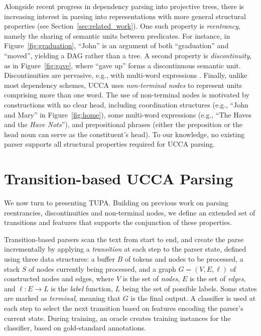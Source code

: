 \documentclass[11pt,a4paper]{article}
\newcommand{\parser}[1]{TUPA\textsubscript{#1}}
\newcommand{\secref}[1]{Section~\ref{#1}}
\newcommand{\figref}[1]{Figure~\ref{#1}}
\begin{document}
Alongside recent progress in dependency parsing into projective trees,
there is increasing interest in parsing into 
representations with more general structural properties  (see \secref{sec:related_work}).
One such property is \textit{reentrancy},
namely the sharing of semantic units between predicates.
For instance, in \figref{fig:graduation},
``John'' is an argument of both ``graduation''
and ``moved'', yielding a DAG rather than a tree.
A second property is \textit{discontinuity},
as in \figref{fig:gave}, where ``gave up'' forms a discontinuous semantic unit.
Discontinuities are pervasive, e.g.,  with multi-word
expressions \cite{schneider2014discriminative}.
Finally, unlike most dependency schemes, UCCA uses \textit{non-terminal nodes}
to represent units comprising more than one word.
The use of non-terminal nodes is motivated by constructions with no clear head, including
coordination structures (e.g., ``John and Mary'' in \figref{fig:home}),
some multi-word expressions (e.g., ``The Haves and the \textit{Have Nots}''),
and prepositional phrases (either the preposition or the head noun can serve as the constituent's head).
To our knowledge, no existing parser supports all structural properties required for UCCA
parsing.



\section{Transition-based UCCA Parsing}\label{sec:parser}

We now turn to presenting \parser{}.
Building on previous work on parsing reentrancies, discontinuities and non-terminal nodes,
we define an extended set of transitions and features that supports the conjunction of
these properties.

Transition-based parsers \cite{Nivre03anefficient} scan the text from start to end,
and create the parse incrementally by applying a \textit{transition}
at each step to the parser state,
defined using three data structures: a buffer $B$ of tokens and nodes to be processed,
a stack $S$ of nodes currently being processed,
and a graph $G=(V,E,\ell)$ of constructed nodes and edges,
where $V$ is the set of \emph{nodes}, $E$ is the set of \emph{edges},
and $\ell : E \to L$ is the \emph{label} function, $L$ being the set of possible labels.
Some states are marked as \textit{terminal}, meaning that $G$ is the final output.
A classifier is used at each step to select the next transition based on features
encoding the parser's current state.
During training, an oracle creates training instances for the classifier,
based on gold-standard annotations.
\end{document}

